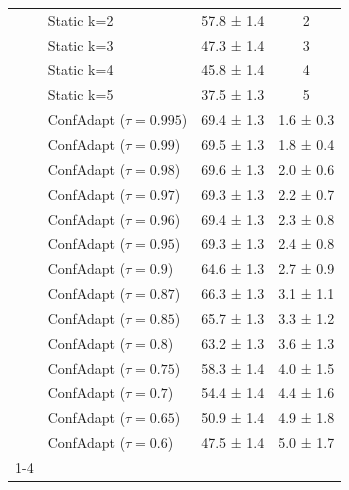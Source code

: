 \documentclass{article}
\theoremstyle{plain}
\theoremstyle{definition}
\theoremstyle{remark}
\begin{document}
\begin{table}[h!]
\begin{tabular}{llcc}
 & Static k=2 & 57.8 ± 1.4 & 2 \\
 & Static k=3 & 47.3 ± 1.4 & 3 \\
 & Static k=4 & 45.8 ± 1.4 & 4 \\
 & Static k=5 & 37.5 ± 1.3 & 5 \\
 & ConfAdapt ($\tau=0.995$) & 69.4 ± 1.3 & 1.6 ± 0.3 \\
 & ConfAdapt ($\tau=0.99$) & 69.5 ± 1.3 & 1.8 ± 0.4 \\
 & ConfAdapt ($\tau=0.98$) & 69.6 ± 1.3 & 2.0 ± 0.6 \\
 & ConfAdapt ($\tau=0.97$) & 69.3 ± 1.3 & 2.2 ± 0.7 \\
 & ConfAdapt ($\tau=0.96$) & 69.4 ± 1.3 & 2.3 ± 0.8 \\
 & ConfAdapt ($\tau=0.95$) & 69.3 ± 1.3 & 2.4 ± 0.8 \\
 & ConfAdapt ($\tau=0.9$) & 64.6 ± 1.3 & 2.7 ± 0.9 \\
 & ConfAdapt ($\tau=0.87$) & 66.3 ± 1.3 & 3.1 ± 1.1 \\
 & ConfAdapt ($\tau=0.85$) & 65.7 ± 1.3 & 3.3 ± 1.2 \\
 & ConfAdapt ($\tau=0.8$) & 63.2 ± 1.3 & 3.6 ± 1.3 \\
 & ConfAdapt ($\tau=0.75$) & 58.3 ± 1.4 & 4.0 ± 1.5 \\
 & ConfAdapt ($\tau=0.7$) & 54.4 ± 1.4 & 4.4 ± 1.6 \\
 & ConfAdapt ($\tau=0.65$) & 50.9 ± 1.4 & 4.9 ± 1.8 \\
 & ConfAdapt ($\tau=0.6$) & 47.5 ± 1.4 & 5.0 ± 1.7 \\
\cline{1-4}
\bottomrule
\end{tabular}
\end{table}
\end{document}
